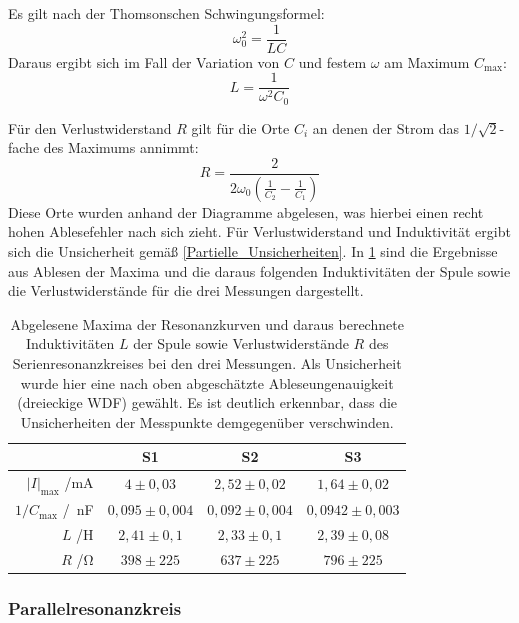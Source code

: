 \documentclass[
	a4paper,
	12pt,
	pagesize,
	ngerman
]{scrartcl}
\begin{document}
	Es gilt nach der Thomsonschen Schwingungsformel:
	\begin{equation}
		\omega_0^2=\frac{1}{LC}
	\end{equation}
	Daraus ergibt sich im Fall der Variation von $C$ und festem $\omega$ am Maximum $ C_\text{max} $:
	\begin{equation}
		L=\frac{1}{\omega^2 C_0}
		\label{Thomson}
	\end{equation}
	
	Für den Verlustwiderstand $R$ gilt für die Orte $C_i$ an denen der Strom das $ 1/\sqrt{2} $-fache des Maximums annimmt:
	\begin{equation}
		R= \frac{2}{2\omega_0 \left( \frac{1}{C_2} - \frac{1}{C_1} \right)}
	\end{equation}
	Diese Orte wurden anhand der Diagramme abgelesen, was hierbei einen recht hohen Ablesefehler nach sich zieht.
	Für Verlustwiderstand und Induktivität ergibt sich die Unsicherheit gemäß \cref{Partielle_Unsicherheiten}.
	In \cref{Serie_Erg} sind die Ergebnisse aus Ablesen der Maxima und die daraus folgenden Induktivitäten der Spule sowie die Verlustwiderstände für die drei Messungen dargestellt.
	
	\begin{table}[H]
		\centering
		\begin{tabular}{ r | c | c | c }
			&S1 & S2 & S3 \\ \hline
			$\left| I \right|_\text{max}$ /\si{mA} & $4\pm 0,03$ &$2,52\pm0,02$ & $1,64\pm 0,02$\\ 
			$1/C_\text{max}$ /\si{\per \nano \farad}& $0,095 \pm 0,004$ & $0,092\pm0,004 $&$0,0942\pm0,003$ \\
			$L$ /\si{\henry} & $2,41 \pm 0,1$ & $2,33\pm 0,1 $&$2,39\pm0,08$ \\
			$R$ /\si{\ohm}  &$ 398\pm 225$&$ 637\pm 225 $ & $796 \pm 225$\\
		\end{tabular}
		\caption{Abgelesene Maxima der Resonanzkurven und daraus berechnete Induktivitäten $L$ der Spule sowie Verlustwiderstände $R$ des Serienresonanzkreises bei den drei Messungen. Als Unsicherheit wurde hier eine nach oben abgeschätzte Ableseungenauigkeit (dreieckige WDF) gewählt. Es ist deutlich erkennbar, dass die Unsicherheiten der Messpunkte demgegenüber verschwinden.}
		\label{Serie_Erg} 
	\end{table}
	
	\subsubsection{Parallelresonanzkreis}
	
\end{document}
